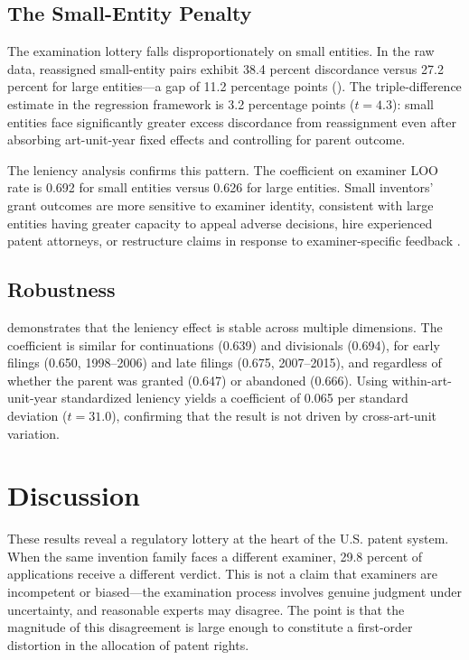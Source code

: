 \documentclass[12pt]{article}
\begin{document}


\subsection{The Small-Entity Penalty}

The examination lottery falls disproportionately on small entities. In the raw data, reassigned small-entity pairs exhibit 38.4 percent discordance versus 27.2 percent for large entities---a gap of 11.2 percentage points (). The triple-difference estimate in the regression framework is 3.2 percentage points ($t = 4.3$): small entities face significantly greater excess discordance from reassignment even after absorbing art-unit-year fixed effects and controlling for parent outcome.

The leniency analysis confirms this pattern. The coefficient on examiner LOO rate is 0.692 for small entities versus 0.626 for large entities. Small inventors' grant outcomes are more sensitive to examiner identity, consistent with large entities having greater capacity to appeal adverse decisions, hire experienced patent attorneys, or restructure claims in response to examiner-specific feedback \citep{lanjouw2001characteristics}.

\subsection{Robustness}

 demonstrates that the leniency effect is stable across multiple dimensions. The coefficient is similar for continuations (0.639) and divisionals (0.694), for early filings (0.650, 1998--2006) and late filings (0.675, 2007--2015), and regardless of whether the parent was granted (0.647) or abandoned (0.666). Using within-art-unit-year standardized leniency yields a coefficient of 0.065 per standard deviation ($t = 31.0$), confirming that the result is not driven by cross-art-unit variation.




\section{Discussion}
\label{sec:discussion}

These results reveal a regulatory lottery at the heart of the U.S. patent system. When the same invention family faces a different examiner, 29.8 percent of applications receive a different verdict. This is not a claim that examiners are incompetent or biased---the examination process involves genuine judgment under uncertainty, and reasonable experts may disagree. The point is that the magnitude of this disagreement is large enough to constitute a first-order distortion in the allocation of patent rights.
\end{document}
